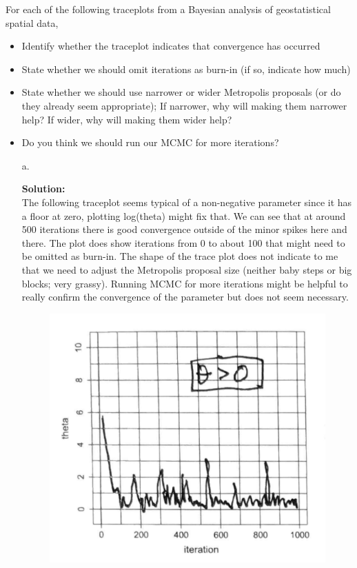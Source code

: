 \documentclass[12pt]{article}
\makeatletter
\theoremstyle{homework}
\newenvironment{exercise}[1]
{\def\@currentlabel{#1}\exercisecore}
{\endexercisecore}
\newcommand{\localhead}[1]{\par\smallskip\noindent\textbf{#1}\nobreak\\}%
\newcommand\solution{\localhead{Solution:}}
\makeatother
\begin{document}
\begin{exercise}{3} For each of the following traceplots from a Bayesian analysis of geostatistical spatial data,
  \begin{itemize}
    \item Identify whether the traceplot indicates that convergence has occurred
    \item State whether we should omit iterations as burn-in (if so, indicate how much)
    \item State whether we should use narrower or wider Metropolis proposals (or do they already seem appropriate); If narrower, why will making them 
    narrower help? If wider, why will making them wider help?
    \item Do you think we should run our MCMC for more iterations?
  \end{itemize}
  \begin{enumerate}
    \item[a.] 
    \solution The following traceplot seems typical of a non-negative parameter since it has a floor at zero, plotting log(theta) might fix that. 
    We can see that at around 500 iterations there is good convergence outside of the minor spikes here and there. 
    The plot does show iterations from 0 to about 100 that might need to be omitted as burn-in. The shape of the trace plot does not indicate to me that we need to adjust the 
    Metropolis proposal size (neither baby steps or big blocks; very grassy). Running MCMC for more iterations might be helpful to really confirm the convergence of the parameter but does not seem necessary. 
    \begin{figure}[H]
      \begin{center}
      \includegraphics[width = .6\textwidth]{1traceplot.png}
      \end{center}
    \end{figure}

\end{enumerate}
\end{exercise}
\end{document}
